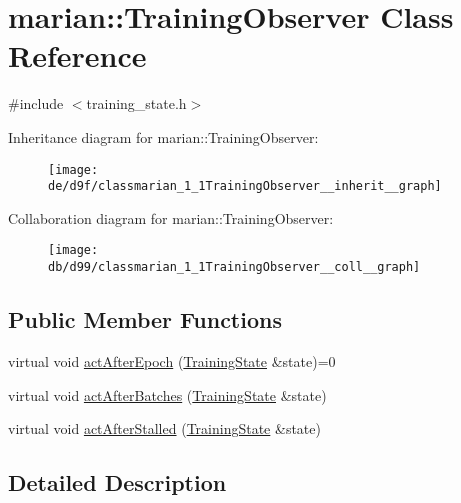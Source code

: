 \hypertarget{classmarian_1_1TrainingObserver}{}\section{marian\+:\+:Training\+Observer Class Reference}
\label{classmarian_1_1TrainingObserver}


{\ttfamily \#include $<$training\+\_\+state.\+h$>$}



Inheritance diagram for marian\+:\+:Training\+Observer\+:
\nopagebreak
\begin{figure}[H]
\begin{center}
\leavevmode
\texttt{[image: de/d9f/classmarian\_1\_1TrainingObserver\_\_inherit\_\_graph]}
\end{center}
\end{figure}


Collaboration diagram for marian\+:\+:Training\+Observer\+:
\nopagebreak
\begin{figure}[H]
\begin{center}
\leavevmode
\texttt{[image: db/d99/classmarian\_1\_1TrainingObserver\_\_coll\_\_graph]}
\end{center}
\end{figure}
\subsection*{Public Member Functions}
\begin{DoxyCompactItemize}
\item 
virtual void \hyperlink{classmarian_1_1TrainingObserver_a518893407fa20fc4b7ab892154de238d}{act\+After\+Epoch} (\hyperlink{classmarian_1_1TrainingState}{Training\+State} \&state)=0
\item 
virtual void \hyperlink{classmarian_1_1TrainingObserver_a941ffcde6aaa5f3b48b48826897829a4}{act\+After\+Batches} (\hyperlink{classmarian_1_1TrainingState}{Training\+State} \&state)
\item 
virtual void \hyperlink{classmarian_1_1TrainingObserver_ac9ae3ce0bb0f3f9d48d6198087161bfc}{act\+After\+Stalled} (\hyperlink{classmarian_1_1TrainingState}{Training\+State} \&state)
\end{DoxyCompactItemize}


\subsection{Detailed Description}


